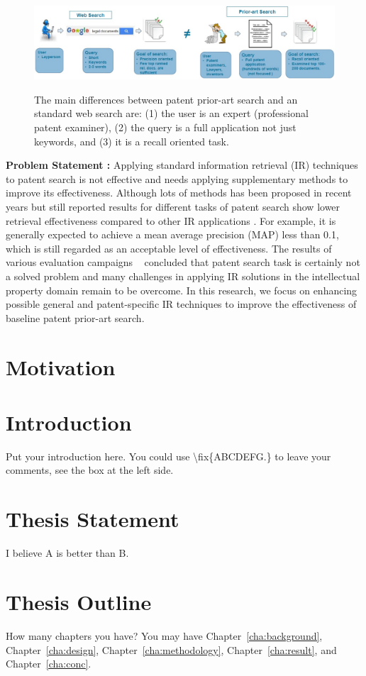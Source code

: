 \begin{figure}[htpb]
   \centering
   \includegraphics[width=\textwidth,height=35mm]{figs/webprior.jpg}
   \caption{The main differences between patent prior-art search and an standard web search are: (1) the user is an expert (professional patent examiner), (2) the query is a full application not just keywords, and (3) it is a recall oriented task.}  
   \label{fig:compareappr} 
\end{figure}
\FloatBarrier 
\noindent
\textbf{Problem Statement :}
Applying standard information retrieval (IR) techniques to patent search is not effective and needs applying supplementary methods to improve its effectiveness. Although lots of methods has been proposed in recent years but still reported results for different tasks of patent search show lower retrieval effectiveness compared to other IR applications \citep{lupu2013patent}. For example, it is generally expected to achieve a mean average precision (MAP) less than 0.1, which is still regarded as an acceptable level of effectiveness. The results of various evaluation campaigns ~\citep{lupu2013patent,joho2010survey, roda2010clef, DBLP:conf/clef/PiroiLHSMF12} concluded that patent search task is certainly not a solved problem and many challenges in applying IR solutions in the intellectual property domain remain to be overcome. In this research, we focus on enhancing possible general and patent-specific IR techniques to improve the effectiveness of baseline patent prior-art search. 


\section{Motivation}
\label{sec:Motivation}

\section{Introduction}
\label{sec:problemstatement}
Put your introduction here. You could use \textbackslash fix\{ABCDEFG.\} to
leave your comments, see the box at the left side.  

\section{Thesis Statement}
\label{sec:thesisstatement}
I believe A is better than B.

\section{Thesis Outline}
\label{sec:outline}
How many chapters you have? You may have Chapter~\ref{cha:background},
Chapter~\ref{cha:design}, Chapter~\ref{cha:methodology},
Chapter~\ref{cha:result}, and Chapter~\ref{cha:conc}.
